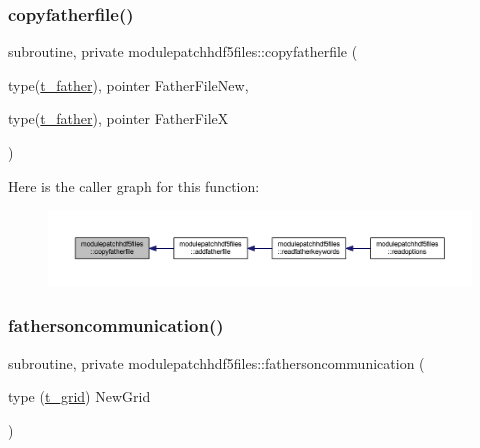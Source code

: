 \subsubsection{\texorpdfstring{copyfatherfile()}{copyfatherfile()}}
{\footnotesize\ttfamily subroutine, private modulepatchhdf5files\+::copyfatherfile (\begin{DoxyParamCaption}\item[{type(\mbox{\hyperlink{structmodulepatchhdf5files_1_1t__father}{t\+\_\+father}}), pointer}]{Father\+File\+New,  }\item[{type(\mbox{\hyperlink{structmodulepatchhdf5files_1_1t__father}{t\+\_\+father}}), pointer}]{Father\+FileX }\end{DoxyParamCaption})\hspace{0.3cm}{\ttfamily [private]}}

Here is the caller graph for this function\+:\nopagebreak
\begin{figure}[H]
\begin{center}
\leavevmode
\includegraphics[width=350pt]{namespacemodulepatchhdf5files_afdb5da0b3386fdd4fe2905c0bc1c4d09_icgraph}
\end{center}
\end{figure}
\mbox{\label{namespacemodulepatchhdf5files_aa9e9da877fcc2414ea0022fe33fa09e9}} 
\subsubsection{\texorpdfstring{fathersoncommunication()}{fathersoncommunication()}}
{\footnotesize\ttfamily subroutine, private modulepatchhdf5files\+::fathersoncommunication (\begin{DoxyParamCaption}\item[{type (\mbox{\hyperlink{structmodulepatchhdf5files_1_1t__grid}{t\+\_\+grid}})}]{New\+Grid }\end{DoxyParamCaption})\hspace{0.3cm}{\ttfamily [private]}}

